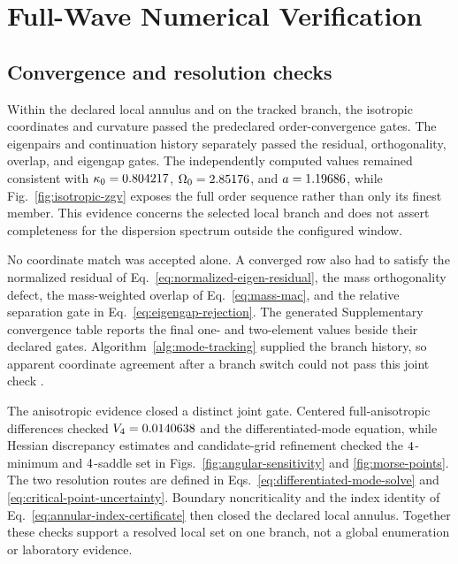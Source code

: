 \section{Full-Wave Numerical Verification}

\subsection{Convergence and resolution checks}

Within the declared local annulus and on the tracked branch, the isotropic
coordinates and curvature passed the predeclared order-convergence gates.
The eigenpairs and continuation history separately passed the residual,
orthogonality, overlap, and eigengap gates.  The independently computed values
remained consistent with
\(\kappa_0=0.804217\), \(\Omega_0=2.85176\), and
\(a=1.19686\), while Fig.~\ref{fig:isotropic-zgv} exposes the full
order sequence rather than only its finest member.  This evidence concerns the
selected local branch and does not assert completeness for the dispersion
spectrum outside the configured window.

No coordinate match was accepted alone.  A converged row also had to satisfy
the normalized residual of Eq.~\eqref{eq:normalized-eigen-residual}, the mass
orthogonality defect, the mass-weighted overlap of Eq.~\eqref{eq:mass-mac}, and
the relative separation gate in Eq.~\eqref{eq:eigengap-rejection}.  The
generated Supplementary convergence table reports the final one- and
two-element values beside their declared gates.  Algorithm~\ref{alg:mode-tracking}
supplied the branch history, so apparent coordinate agreement after a branch
switch could not pass this joint check \citep{adamou2004spectral,kiefer2023computing}.

The anisotropic evidence closed a distinct joint gate.  Centered
full-anisotropic differences checked \(V_4=0.0140638\) and the differentiated-mode
equation, while Hessian discrepancy estimates and candidate-grid refinement
checked the \(4\)-minimum and
\(4\)-saddle set in
Figs.~\ref{fig:angular-sensitivity} and \ref{fig:morse-points}.  The two
resolution routes are defined in Eqs.~\eqref{eq:differentiated-mode-solve}
and \eqref{eq:critical-point-uncertainty}.  Boundary noncriticality and the
index identity of Eq.~\eqref{eq:annular-index-certificate} then closed the
declared local annulus.  Together these checks support a resolved local set
on one branch, not a global enumeration or laboratory evidence.


